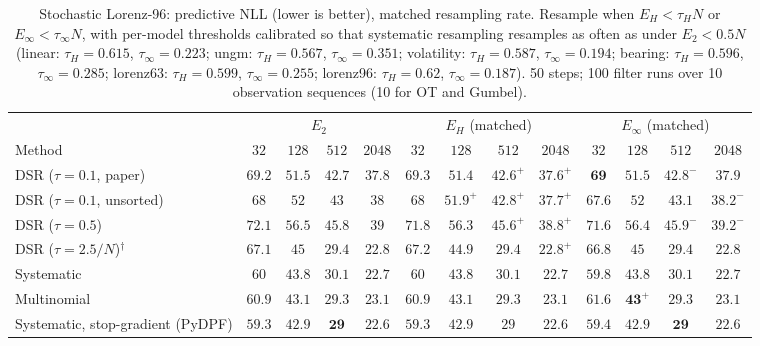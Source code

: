 \begin{table}[ht]
\centering
\small
\caption{Stochastic Lorenz-96: predictive NLL (lower is better), matched resampling rate. Resample when $E_H<\tau_HN$ or $E_\infty<\tau_\infty N$, with per-model thresholds calibrated so that systematic resampling resamples as often as under $E_2<0.5N$ (linear: $\tau_H{=}0.615$, $\tau_\infty{=}0.223$; ungm: $\tau_H{=}0.567$, $\tau_\infty{=}0.351$; volatility: $\tau_H{=}0.587$, $\tau_\infty{=}0.194$; bearing: $\tau_H{=}0.596$, $\tau_\infty{=}0.285$; lorenz63: $\tau_H{=}0.599$, $\tau_\infty{=}0.255$; lorenz96: $\tau_H{=}0.62$, $\tau_\infty{=}0.187$). 50 steps; 100 filter runs over 10 observation sequences (10 for OT and Gumbel).}
\label{tab:trigger-matched-lorenz96-predictive_nll}
\begin{adjustbox}{max width=\linewidth}
\begin{tabular}{lcccc|cccc|cccc}
\toprule
 & \multicolumn{4}{c}{$E_2$} & \multicolumn{4}{c}{$E_H$ (matched)} & \multicolumn{4}{c}{$E_\infty$ (matched)} \\
\cmidrule(lr){2-5} \cmidrule(lr){6-9} \cmidrule(lr){10-13}
Method & $32$ & $128$ & $512$ & $2048$ & $32$ & $128$ & $512$ & $2048$ & $32$ & $128$ & $512$ & $2048$ \\
\midrule
DSR ($\tau{=}0.1$, paper) & $69.2$ & $51.5$ & $42.7$ & $37.8$ & $69.3$ & $\mathbf{51.4}$ & $\mathbf{42.6}^{+}$ & $\mathbf{37.6}^{+}$ & $\mathbf{69}$ & $51.5$ & $42.8^{-}$ & $37.9$ \\
DSR ($\tau{=}0.1$, unsorted) & $68$ & $52$ & $43$ & $38$ & $68$ & $\mathbf{51.9}^{+}$ & $\mathbf{42.8}^{+}$ & $\mathbf{37.7}^{+}$ & $\mathbf{67.6}$ & $52$ & $43.1$ & $38.2^{-}$ \\
DSR ($\tau{=}0.5$) & $72.1$ & $56.5$ & $45.8$ & $39$ & $71.8$ & $\mathbf{56.3}$ & $\mathbf{45.6}^{+}$ & $\mathbf{38.8}^{+}$ & $\mathbf{71.6}$ & $56.4$ & $45.9^{-}$ & $39.2^{-}$ \\
DSR ($\tau{=}2.5/N$)$^\dagger$ & $67.1$ & $45$ & $\mathbf{29.4}$ & $22.8$ & $67.2$ & $\mathbf{44.9}$ & $29.4$ & $\mathbf{22.8}^{+}$ & $\mathbf{66.8}$ & $45$ & $29.4$ & $22.8$ \\
\midrule
Systematic & $60$ & $\mathbf{43.8}$ & $30.1$ & $\mathbf{22.7}$ & $60$ & $43.8$ & $\mathbf{30.1}$ & $22.7$ & $\mathbf{59.8}$ & $\mathbf{43.8}$ & $30.1$ & $22.7$ \\
Multinomial & $60.9$ & $43.1$ & $\mathbf{29.3}$ & $\mathbf{23.1}$ & $\mathbf{60.9}$ & $43.1$ & $29.3$ & $23.1$ & $61.6$ & $\mathbf{43}^{+}$ & $29.3$ & $\mathbf{23.1}$ \\
Systematic, stop-gradient (PyDPF) & $59.3$ & $\mathbf{42.9}$ & $\mathbf{29}$ & $22.6$ & $\mathbf{59.3}$ & $42.9$ & $29$ & $22.6$ & $59.4$ & $42.9$ & $\mathbf{29}$ & $\mathbf{22.6}$ \\

\end{tabular}
\end{adjustbox}
\end{table}
